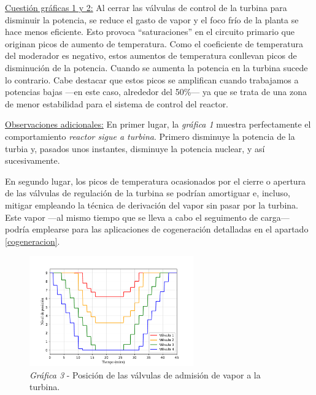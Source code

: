 \underline{Cuestión gráficas 1 y 2:} Al cerrar las válvulas de control de la turbina para disminuir la potencia, se reduce el gasto de vapor y el foco frío de la planta se hace menos eficiente. Esto provoca ``saturaciones'' en el circuito primario que originan picos de aumento de temperatura. Como el coeficiente de temperatura del moderador es negativo, estos aumentos de temperatura conllevan picos de disminución de la potencia. Cuando se aumenta la potencia en la turbina sucede lo contrario. Cabe destacar que estos picos se amplifican cuando trabajamos a potencias bajas ---en este caso, alrededor del 50\%--- ya que se trata de una zona de menor estabilidad para el sistema de control del reactor.

\underline{Observaciones adicionales:} En primer lugar, la \textit{gráfica 1} muestra perfectamente el comportamiento \textit{reactor sigue a turbina}. Primero disminuye la potencia de la turbia y, pasados unos instantes, disminuye la potencia nuclear, y así sucesivamente.

En segundo lugar, los picos de temperatura ocasionados por el cierre o apertura de las válvulas de regulación de la turbina se podrían amortiguar e, incluso, mitigar empleando la técnica de derivación del vapor sin pasar por la turbina. Este vapor ---al mismo tiempo que se lleva a cabo el seguimento de carga--- podría emplearse para las aplicaciones de cogeneración detalladas en el apartado \ref{cogeneracion}.

\begin{figure}[!h]
  \centering
  \includegraphics[width=0.63\textwidth]{content/figures/sim1_valvulas_control.pdf}
  \caption{\textit{Gráfica 3} - Posición de las válvulas de admisión de vapor a la turbina.}
  \label{fig:sim1_valvulas_control}
\end{figure}


